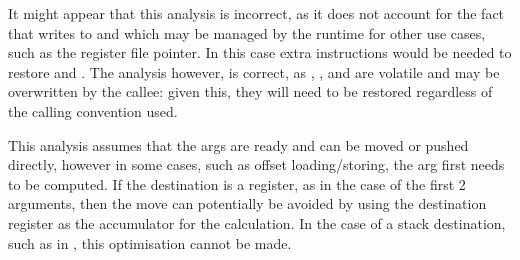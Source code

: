 It might appear that this analysis is incorrect, as it does not account for the fact that  writes to  and  which may be managed by the runtime for other use cases, such as the register file pointer. In this case extra instructions would be needed to restore  and . The analysis however, is correct, as , , and  are volatile \cite{msvc-registers} and may be overwritten by the callee: given this, they will need to be restored regardless of the calling convention used.

This analysis assumes that the args are ready and can be moved or pushed directly, however in some cases, such as offset loading/storing, the arg first needs to be computed. If the destination is a register, as in the case of the first 2  arguments, then the move can potentially be avoided by using the destination register as the accumulator for the calculation. In the case of a stack destination, such as in , this optimisation cannot be made.
